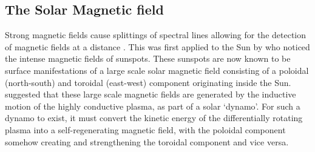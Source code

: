 \documentclass[11pt,a4paper,onecolumn]{report}
\begin{document}
\subsection{The Solar Magnetic field}
%
\label{sec:dynamo}
 Strong magnetic fields cause splittings of
spectral lines allowing for the detection of magnetic fields at a distance
\citep{zeeman_over_1896}. This was first applied to the Sun by
\citet{hale_probable_1908} who noticed the intense magnetic fields of sunspots.
These sunspots are now known to be surface manifestations of a large scale solar
magnetic field consisting of a poloidal (north-south) and toroidal (east-west)
component originating inside the Sun. \citet{JosephLarmor1919} suggested that
these large scale magnetic fields are generated by the inductive motion of the
highly conductive plasma, as part of a solar `dynamo'. For such a dynamo to
exist, it must convert the kinetic energy of the differentially rotating plasma
into a self-regenerating magnetic field, with the poloidal component somehow
creating and strengthening the toroidal component and vice versa. \\
\end{document}
